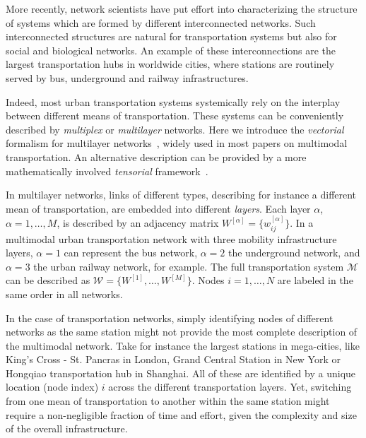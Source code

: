 More recently, network scientists have put effort into characterizing the structure of systems which are formed by different interconnected networks. Such interconnected structures are natural for transportation systems but also for social and biological networks. An example of these interconnections are the largest transportation hubs in worldwide cities, where stations are routinely served by bus, underground and railway infrastructures.

Indeed, most urban transportation systems systemically rely on the interplay between different means of transportation. These systems can be conveniently described by \textit{multiplex} or \textit{multilayer} networks. Here we introduce the \textit{vectorial} formalism for multilayer networks~\cite{boccaletti2014structure, battiston2014structural}, widely used in most papers on multimodal transportation. An alternative description can be provided by a more mathematically involved \textit{tensorial} framework~\cite{dedomenico2013mathematical, kivela2014multilayer}.  

In multilayer networks, links of different types, describing for instance a different mean of transportation, are embedded into different \textit{layers}. Each layer $\alpha$, $\alpha = 1, \ldots, M$, is described by an adjacency matrix $W^{[\alpha]} = \{w_{ij}^{[\alpha]}\}$. In a multimodal urban transportation network with three mobility infrastructure layers, $\alpha=1$ can represent the bus network, $\alpha=2$ the underground network, and $\alpha=3$ the urban railway network, for example. The full transportation system $\mathcal M$ can be described as $\mathcal W = \{ W^{[1]}, \ldots,  W^{[M]}\}$. Nodes $i=1, \dots, N$ are labeled in the same order in all networks. 

In the case of transportation networks, simply identifying nodes of different networks as the same station might not provide the most complete description of the multimodal network. Take for instance the largest stations in mega-cities, like King's Cross - St. Pancras in London, Grand Central Station in New York or Hongqiao transportation hub in Shanghai. All of these are identified by a unique location (node index) $i$ across the different transportation layers. Yet, switching from one mean of transportation to another within the same station might require a non-negligible fraction of time and effort, given the complexity and size of the overall infrastructure. 

